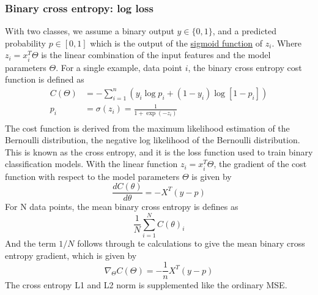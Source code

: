 \subsubsection{Binary cross entropy: log loss}
With two classes, we assume a binary output $y \in \{0, 1\}$, and a predicted probability $p \in [0, 1]$ which is
the output of the \hyperref[eq:Sigmoid]{sigmoid function} of $z_i$. 
Where $z_i = x_i^T\Theta$ is the linear combination of the input features and the model parameters $\Theta$. 
For a single example, data point $i$, the binary cross entropy cost function is defined as 
\begin{align}
    C(\Theta) &= -\sum_{i=1}^{n}(y_i \log p_i + 
    (1 - y_i)\log[1 - p_i]) \\
    p_i &= \sigma(z_i) = \frac{1}{1 + \exp(-z_i)} \\
    \label{eq: BinaryCost}
\end{align}
The cost function is derived from the maximum likelihood estimation of the Bernoulli distribution,
the negative log likelihood of the Bernoulli distribution. This is known as the cross entropy, and
it is the loss function used to train binary classification models. 
With the linear function $z_i = x_i^T\Theta$, the gradient of the cost function with respect 
to the model parameters $\Theta$ is given by
\begin{equation}
    \frac{dC(\theta)}{d\theta} = -X^T(y - p)
    \label{eq: BinaryCostGradient}
\end{equation}
For N data points, the mean binary cross entropy is defines as $$\frac{1}{N}\sum_{i=1}^{N}C(\theta)_i$$
And the term $1/N$ follows through te calculations to give the mean binary cross entropy gradient, which is given by
\begin{equation}
    \nabla_\Theta C(\Theta) = -\frac{1}{n}X^T(y - p)
    \label{eq:MeanBinaryCostGradient}
\end{equation}
The cross entropy L1 and L2 norm is supplemented like the ordinary MSE. 


